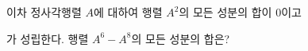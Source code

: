 이차 정사각행렬 $A$에 대하여 행렬 $A^2$의 모든 성분의 합이 $0$이고\par\smallskip{}\par\smallskip\noindent 가 성립한다. 행렬 $A^6-A^8$의 모든 성분의 합은?
